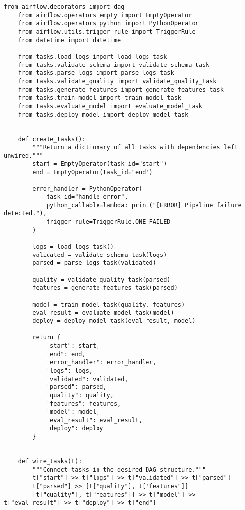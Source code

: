 \begin{lstlisting}[caption={Airflow DAG with parallel data quality validation and feature engineering before training.}, label={lst:airflowdag_parallel}]
    from airflow.decorators import dag
    from airflow.operators.empty import EmptyOperator
    from airflow.operators.python import PythonOperator
    from airflow.utils.trigger_rule import TriggerRule
    from datetime import datetime
    
    from tasks.load_logs import load_logs_task
    from tasks.validate_schema import validate_schema_task
    from tasks.parse_logs import parse_logs_task
    from tasks.validate_quality import validate_quality_task
    from tasks.generate_features import generate_features_task
    from tasks.train_model import train_model_task
    from tasks.evaluate_model import evaluate_model_task
    from tasks.deploy_model import deploy_model_task
    
    
    def create_tasks():
        """Return a dictionary of all tasks with dependencies left unwired."""
        start = EmptyOperator(task_id="start")
        end = EmptyOperator(task_id="end")
    
        error_handler = PythonOperator(
            task_id="handle_error",
            python_callable=lambda: print("[ERROR] Pipeline failure detected."),
            trigger_rule=TriggerRule.ONE_FAILED
        )
    
        logs = load_logs_task()
        validated = validate_schema_task(logs)
        parsed = parse_logs_task(validated)
    
        quality = validate_quality_task(parsed)
        features = generate_features_task(parsed)
    
        model = train_model_task(quality, features)
        eval_result = evaluate_model_task(model)
        deploy = deploy_model_task(eval_result, model)
    
        return {
            "start": start,
            "end": end,
            "error_handler": error_handler,
            "logs": logs,
            "validated": validated,
            "parsed": parsed,
            "quality": quality,
            "features": features,
            "model": model,
            "eval_result": eval_result,
            "deploy": deploy
        }
    
    
    def wire_tasks(t):
        """Connect tasks in the desired DAG structure."""
        t["start"] >> t["logs"] >> t["validated"] >> t["parsed"]
        t["parsed"] >> [t["quality"], t["features"]]
        [t["quality"], t["features"]] >> t["model"] >> t["eval_result"] >> t["deploy"] >> t["end"]
    

\end{lstlisting}
